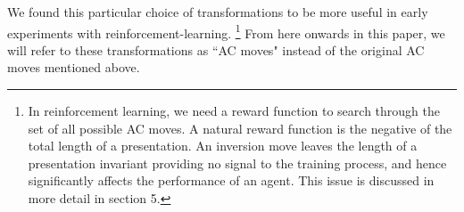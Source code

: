 We found this particular choice of transformations to be more useful in early experiments with reinforcement-learning. 
\footnote{In reinforcement learning, we need a reward function to search through the set of all possible AC moves. A natural reward function is the negative of the total length of a presentation. An inversion move leaves the length of a presentation invariant providing no signal to the training process, and hence significantly affects the performance of an agent. This issue is discussed in more detail in section 5.}
From here onwards in this paper, we will refer to these transformations as ``AC moves" instead of the original AC moves mentioned above.

